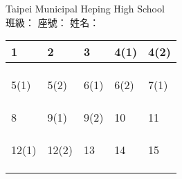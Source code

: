 \documentclass[12pt]{examdesign}
\newcommand{\SchoolName}{Taipei Municipal Heping High School}
\begin{document}
\begin{examclosing}
\vfill
\begin{center}
{\Large \SchoolName}\\[3mm]
\bigskip
班級：\underline{\qquad \qquad} \qquad
座號：\underline{\qquad \qquad} \qquad
姓名：\underline{\qquad \qquad \qquad \qquad\qquad} \qquad
\end{center}
\bigskip


\begin{center}
\begin{tabular}{|p{3.5cm}|p{3.5cm}|p{3.5cm}|p{3.5cm}|p{3.5cm}|}
\toprule
1&2&3&4(1)&4(2)\\
\midrule
&&&&\\
&&&&\\
&&&&\\
\midrule
5(1)&5(2)&6(1)&6(2)&7(1)\\
\midrule
&&&&\\
&&&&\\
&&&&\\
\midrule
8&9(1)&9(2)&10&11\\
\midrule
&&&&\\
&&&&\\
&&&&\\
\midrule
12(1)&12(2)&13&14&15\\
\midrule
&&&&\\
&&&&\\
&&&&\\
\bottomrule
\end{tabular}
\end{center}
\end{examclosing}
\end{document}
